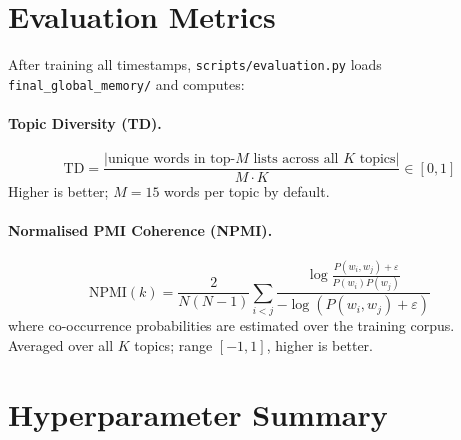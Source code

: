 \documentclass[11pt,a4paper]{article}
\begin{document}
\section{Evaluation Metrics}

After training all timestamps, \texttt{scripts/evaluation.py} loads
\texttt{final\_global\_memory/} and computes:

\paragraph{Topic Diversity (TD).}
\[
  \text{TD} = \frac{|\text{unique words in top-}M\text{ lists across all }K\text{ topics}|}{M \cdot K}
  \in [0, 1]
\]
Higher is better; $M=15$ words per topic by default.

\paragraph{Normalised PMI Coherence (NPMI).}
\[
  \text{NPMI}(k) = \frac{2}{N(N-1)}\sum_{i<j}
  \frac{\log\frac{P(w_i,w_j) + \varepsilon}{P(w_i)P(w_j)}}
       {-\log(P(w_i,w_j) + \varepsilon)}
\]
where co-occurrence probabilities are estimated over the training corpus.
Averaged over all $K$ topics; range $[-1, 1]$, higher is better.

\section{Hyperparameter Summary}
\end{document}
